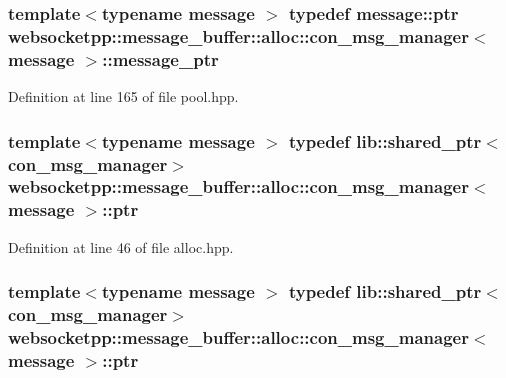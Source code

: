 \subsubsection[{message\+\_\+ptr}]{\setlength{\rightskip}{0pt plus 5cm}template$<$typename message $>$ typedef {\bf message\+::ptr} {\bf websocketpp\+::message\+\_\+buffer\+::alloc\+::con\+\_\+msg\+\_\+manager}$<$ {\bf message} $>$\+::{\bf message\+\_\+ptr}}\label{classwebsocketpp_1_1message__buffer_1_1alloc_1_1con__msg__manager_a2b7d97fc21ff99e307ec20fe0369f294}


Definition at line 165 of file pool.\+hpp.

\hypertarget{classwebsocketpp_1_1message__buffer_1_1alloc_1_1con__msg__manager_ab4a21eb77cea439747f0b988e643e940}{}
\subsubsection[{ptr}]{\setlength{\rightskip}{0pt plus 5cm}template$<$typename message $>$ typedef lib\+::shared\+\_\+ptr$<${\bf con\+\_\+msg\+\_\+manager}$>$ {\bf websocketpp\+::message\+\_\+buffer\+::alloc\+::con\+\_\+msg\+\_\+manager}$<$ {\bf message} $>$\+::{\bf ptr}}\label{classwebsocketpp_1_1message__buffer_1_1alloc_1_1con__msg__manager_ab4a21eb77cea439747f0b988e643e940}


Definition at line 46 of file alloc.\+hpp.

\hypertarget{classwebsocketpp_1_1message__buffer_1_1alloc_1_1con__msg__manager_ab4a21eb77cea439747f0b988e643e940}{}
\subsubsection[{ptr}]{\setlength{\rightskip}{0pt plus 5cm}template$<$typename message $>$ typedef lib\+::shared\+\_\+ptr$<${\bf con\+\_\+msg\+\_\+manager}$>$ {\bf websocketpp\+::message\+\_\+buffer\+::alloc\+::con\+\_\+msg\+\_\+manager}$<$ {\bf message} $>$\+::{\bf ptr}}\label{classwebsocketpp_1_1message__buffer_1_1alloc_1_1con__msg__manager_ab4a21eb77cea439747f0b988e643e940}


